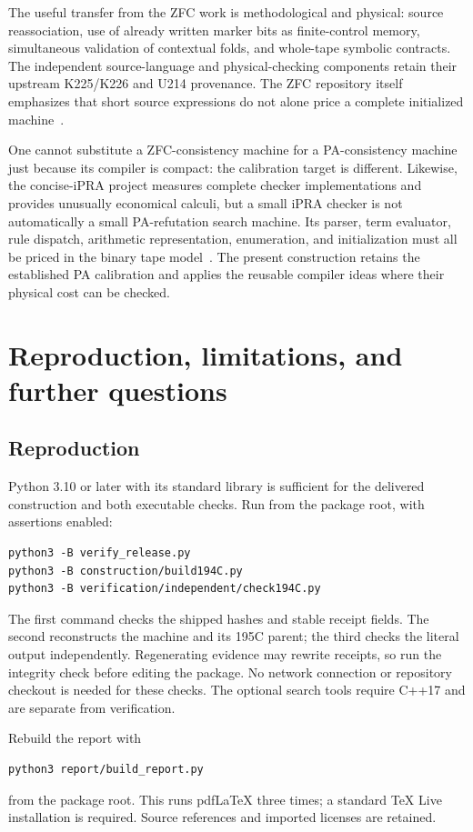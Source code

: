 \documentclass[11pt]{article}
\begin{document}
The useful transfer from the ZFC work is methodological and physical:
source reassociation, use of already written marker bits as finite-control
memory, simultaneous validation of contextual folds, and whole-tape
symbolic contracts. The independent source-language and physical-checking
components retain their upstream K225/K226 and U214 provenance. The ZFC
repository itself emphasizes that short source expressions do not alone
price a complete initialized machine~\cite{zfcreadme}.

One cannot substitute a ZFC-consistency machine for a PA-consistency
machine just because its compiler is compact: the calibration target is
different. Likewise, the concise-iPRA project measures complete checker
implementations and provides unusually economical calculi, but a small
iPRA checker is not automatically a small PA-refutation search machine.
Its parser, term evaluator, rule dispatch, arithmetic representation,
enumeration, and initialization must all be priced in the binary tape
model~\cite{iprareadme}. The present construction retains the established
PA calibration and applies the reusable compiler ideas where their
physical cost can be checked.

\section{Reproduction, limitations, and further questions}

\subsection{Reproduction}

Python 3.10 or later with its standard library is sufficient for the
delivered construction and both executable checks. Run from the package
root, with assertions enabled:
\begin{lstlisting}
python3 -B verify_release.py
python3 -B construction/build194C.py
python3 -B verification/independent/check194C.py
\end{lstlisting}
The first command checks the shipped hashes and stable receipt fields.
The second reconstructs the machine and its 195C parent; the third
checks the literal output independently. Regenerating evidence may
rewrite receipts, so run the integrity check before editing the package.
No network connection or repository checkout is needed for these checks.
The optional search tools require C++17 and are separate from verification.

Rebuild the report with
\begin{lstlisting}
python3 report/build_report.py
\end{lstlisting}
from the package root. This runs pdfLaTeX three times; a standard TeX Live
installation is required. Source references and imported licenses are retained.
\end{document}
